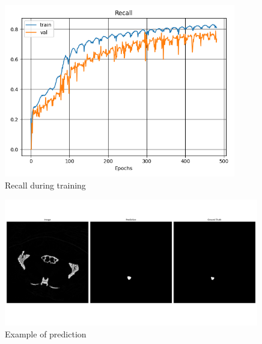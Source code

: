 \begin{figure}[!htb]
    \centering
    \includegraphics[width=0.9\textwidth]{images/plots/Recall.png}
    \caption{Recall during training}
    \label{fig::Recall}
\end{figure}

\begin{figure}[!htb]
    \centering
    \includegraphics[width=0.99\textwidth]{images/results/prediction1.png}
    \caption{Example of prediction}
    \label{fig::Prediction1}
\end{figure}